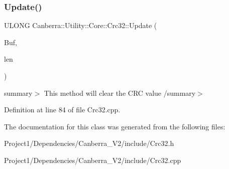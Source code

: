 \subsubsection{\texorpdfstring{Update()}{Update()}\hspace{0.1cm}{\footnotesize\ttfamily [2/2]}}
{\footnotesize\ttfamily U\+L\+O\+NG Canberra\+::\+Utility\+::\+Core\+::\+Crc32\+::\+Update (\begin{DoxyParamCaption}\item[{const char $\ast$const}]{Buf,  }\item[{L\+O\+NG}]{len }\end{DoxyParamCaption})}

summary$>$ This method will clear the C\+RC value /summary$>$ 

Definition at line 84 of file Crc32.\+cpp.



The documentation for this class was generated from the following files\+:\begin{DoxyCompactItemize}
\item 
Project1/\+Dependencies/\+Canberra\+\_\+\+V2/include/Crc32.\+h\item 
Project1/\+Dependencies/\+Canberra\+\_\+\+V2/include/Crc32.\+cpp\end{DoxyCompactItemize}
